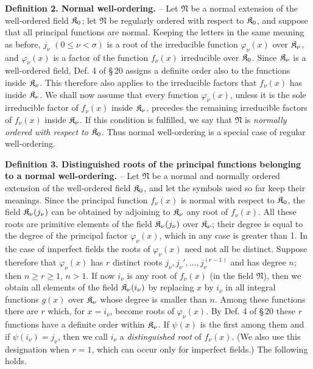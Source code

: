 \textbf{Definition 2. Normal well-ordering.} -- Let $\mathfrak N$ be a normal extension of the well-ordered field $\mathfrak K_0$; let $\mathfrak N$ be regularly ordered with respect to $\mathfrak K_0$, and suppose that all principal functions are normal. Keeping the letters in the same meaning as before, $j_\nu$ $(0\leq\nu<\sigma)$ is a root of the irreducible function $\varphi_\nu(x)$ over $\mathfrak K_\nu$, and $\varphi_\nu(x)$ is a factor of the function $f_\nu(x)$ irreducible over $\mathfrak K_0$. Since $\mathfrak K_\nu$ is a well-ordered field, Def. 4 of \S\,20 assigns a definite order also to the functions inside $\mathfrak K_\nu$. This therefore also applies to the irreducible factors that $f_\nu(x)$ has inside $\mathfrak K_\nu$. We shall now assume that every function $\varphi_\nu(x)$, unless it is the sole irreducible factor of $f_\nu(x)$ inside $\mathfrak K_\nu$, precedes the remaining irreducible factors of $f_\nu(x)$ inside $\mathfrak K_\nu$. If this condition is fulfilled, we say that $\mathfrak N$ is \emph{normally ordered with respect to $\mathfrak K_0$}. Thus normal well-ordering is a special case of regular well-ordering.

\textbf{Definition 3. Distinguished roots of the principal functions belonging to a normal well-ordering.} -- Let $\mathfrak N$ be a normal and normally ordered extension of the well-ordered field $\mathfrak K_0$, and let the symbols used so far keep their meanings. Since the principal function $f_\nu(x)$ is normal with respect to $\mathfrak K_0$, the field $\mathfrak K_\nu(j_\nu)$ can be obtained by adjoining to $\mathfrak K_\nu$ any root of $f_\nu(x)$. All these roots are primitive elements of the field $\mathfrak K_\nu(j_\nu)$ over $\mathfrak K_\nu$; their degree is equal to the degree of the principal factor $\varphi_\nu(x)$, which in any case is greater than 1. In the case of imperfect fields the roots of $\varphi_\nu(x)$ need not all be distinct. Suppose therefore that $\varphi_\nu(x)$ has $r$ distinct roots $j_\nu,j_\nu',\ldots,j_\nu^{(r-1)}$ and has degree $n$; then $n\geq r\geq1$, $n>1$. If now $i_\nu$ is any root of $f_\nu(x)$ (in the field $\mathfrak N$), then we obtain all elements of the field $\mathfrak K_\nu(i_\nu)$ by replacing $x$ by $i_\nu$ in all integral functions $g(x)$ over $\mathfrak K_\nu$ whose degree is smaller than $n$. Among these functions there are $r$ which, for $x=i_\nu$, become roots of $\varphi_\nu(x)$. By Def. 4 of \S\,20 these $r$ functions have a definite order within $\mathfrak K_\nu$. If $\psi(x)$ is the first among them and if $\psi(i_\nu)=j_\nu$, then we call $i_\nu$ a \emph{distinguished root} of $f_\nu(x)$. (We also use this designation when $r=1$, which can occur only for imperfect fields.) The following holds.

